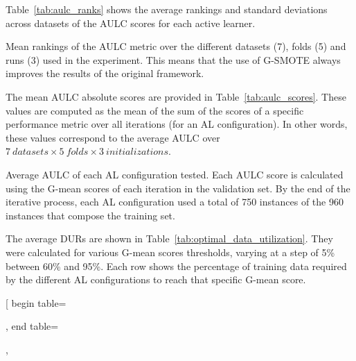 \documentclass[remotesensing,article,submit,moreauthors,pdftex]{Definitions/mdpi}
\begin{document}
\begin{paracol}{2}
Table~\ref{tab:aulc_ranks} shows the average rankings and standard deviations
across datasets of the AULC scores for each active learner.

\begin{table}[H]
    \centering
    \caption{
        Mean rankings of the AULC metric over the different datasets (7),
        folds (5) and runs (3) used in the experiment. This means that the use
        of G-SMOTE  always improves the results of the original
        framework.
    }\label{tab:aulc_ranks}
\end{table}

The mean AULC absolute scores are provided in Table~\ref{tab:aulc_scores}.
These values are computed as the mean of the sum of the scores of a specific
performance metric over all iterations (for an AL configuration). In other
words, these values correspond to the average AULC over $7\ datasets \times 5\
folds \times 3\ initializations$.

\begin{table}[htb]
    \centering
    \caption{\label{tab:aulc_scores}
        Average AULC of each AL configuration tested. Each AULC score is
        calculated using the G-mean scores of each iteration in the validation
        set. By the end of the iterative process, each AL configuration used a
        total of 750 instances of the 960 instances that compose the training
        set.
    }
\end{table}

The average DURs are shown in Table~\ref{tab:optimal_data_utilization}. They
were calculated for various G-mean scores thresholds, varying at a step of 5\%
between 60\% and 95\%. Each row shows the percentage of training data required
by the different AL configurations to reach that specific G-mean score.

\end{paracol}
\captionsetup{justification=centering}
\pgfplotstabletypeset[
	begin table=\begin{longtable},
	end table=\end{longtable},
\end{document}

